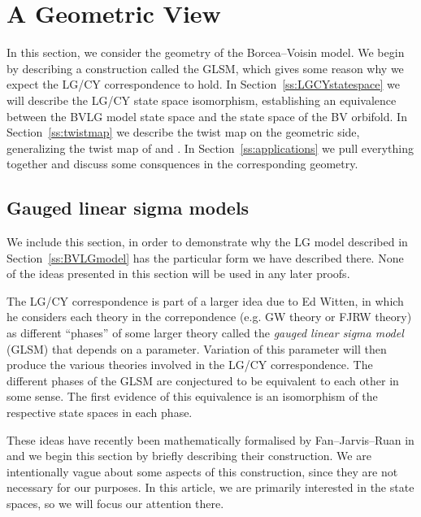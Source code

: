 \documentclass[10pt, letterpaper]{amsart}
\theoremstyle{remark}
\begin{document}


\section{A Geometric View}\label{s:geometry}

In this section, we consider the geometry of the Borcea--Voisin model. We begin by describing a construction called the GLSM, which gives some reason why we expect the LG/CY correspondence to hold. %
In Section~\ref{ss:LGCYstatespace} we will describe the LG/CY state space isomorphism, establishing an equivalence between the BVLG model state space and the state space of the BV orbifold. In Section~\ref{ss:twistmap} we describe the twist map on the geometric side, generalizing the twist map of \cite{Borcea} and \cite{ABS}. In Section~\ref{ss:applications} we pull everything together and discuss some consquences in the corresponding geometry. 



\subsection{Gauged linear sigma models}\label{ss:GLSM}
We include this section, in order to demonstrate why the LG model described in Section~\ref{ss:BVLGmodel} has the particular form we have described there. None of the ideas presented in this section will be used in any later proofs. 

The LG/CY correspondence is part of a larger idea due to Ed Witten, in which he considers each theory in the correpondence (e.g. GW theory or FJRW theory) as different ``phases'' of some larger theory called the \emph{gauged linear sigma model} (GLSM) that depends on a parameter. Variation of this parameter will then produce the various theories involved in the LG/CY correspondence. The different phases of the GLSM are conjectured to be equivalent to each other in some sense. The first evidence of this equivalence is an isomorphism of the respective state spaces in each phase. 

These ideas have recently been mathematically formalised by Fan--Jarvis--Ruan in \cite{FJR15} and we begin this section by briefly describing their construction. We are intentionally vague about some aspects of this construction, since they are not necessary for our purposes. In this article, we are primarily interested in the state spaces, so we will focus our attention there. 
\end{document}
